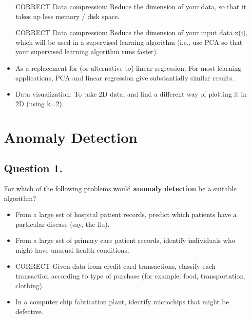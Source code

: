 \begin{itemize}
\item [CORRECT] Data compression: Reduce the dimension of your data, so that it takes up less memory / disk space.

\item [CORRECT] Data compression: Reduce the dimension of your input data x(i), which will be used in a supervised learning algorithm (i.e., use PCA so that your supervised learning algorithm runs faster).

\item As a replacement for (or alternative to) linear regression: For most learning applications, PCA and linear regression give substantially similar results.

\item Data visualization: To take 2D data, and find a different way of plotting it in 2D (using k=2).

\end{itemize}

\section{Anomaly Detection}

\subsection*{Question 1. }
For which of the following problems would \textbf{anomaly detection} be a suitable algorithm?

\begin{itemize}
\item From a large set of hospital patient records, predict which patients have a particular disease (say, the flu).
\item From a large set of primary care patient records, identify individuals who might have unusual health conditions.
\item CORRECT
Given data from credit card transactions, classify each transaction according to type of purchase (for example: food, transportation, clothing).
\item 
In a computer chip fabrication plant, identify microchips that might be defective.
\end{itemize}

